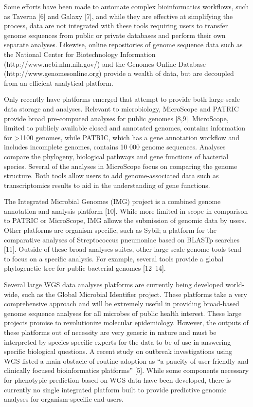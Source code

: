 \documentclass{bmcart}
\begin{document}
Some efforts have been made to automate complex bioinformatics workflows, such as Taverna [6] and Galaxy [7], and while they are effective at simplifying the process, data are not integrated with these tools requiring users to transfer genome sequences from public or private databases and perform their own separate analyses. Likewise, online repositories of genome sequence data such as the National Center for Biotechnology Information (http://www.ncbi.nlm.nih.gov/) and the Genomes Online Database (http://www.genomesonline.org) provide a wealth of data, but are decoupled from an efficient analytical platform.

Only recently have platforms emerged that attempt to provide both large-scale data storage and analyses. Relevant to microbiology, MicroScope and PATRIC provide broad pre-computed analyses for public genomes [8,9]. MicroScope, limited to publicly available closed and annotated genomes, contains information for >1100 genomes, while PATRIC, which has a gene annotation workflow and includes incomplete genomes, contains 10 000 genome sequences. Analyses compare the phylogeny, biological pathways and gene functions of bacterial species. Several of the analyses in MicroScope focus on comparing the genome structure. Both tools allow users to add genome-associated data such
as transcriptomics results to aid in the understanding of gene functions.

The Integrated Microbial Genomes (IMG) project is a combined genome annotation and analysis platform [10]. While more limited in scope in comparison to PATRIC or MicroScope, IMG allows the submission of genomic data by users. Other platforms are organism specific, such as Sybil; a platform for the comparative analyses of Streptococcus pneumoniae based on BLASTp searches [11]. Outside of these broad analyses suites, other large-scale genome tools tend to focus on a specific analysis. For example, several tools provide a global phylogenetic tree for public bacterial genomes [12–14]. 

Several large WGS data analyses platforms are currently being developed world-wide, such as the Global Microbial Identifier project. These platforms take a very comprehensive approach and will be extremely useful in providing broad-based genome sequence analyses for all microbes of public health interest. These large projects promise to revolutionize molecular epidemiology. However, the outputs of these platforms out of necessity are very generic in nature and must be interpreted by species-specific experts for the data to be of use in answering specific biological questions. A recent study on outbreak investigations using WGS listed a main obstacle of routine adoption as “a paucity of user-friendly and clinically focused bioinformatics platforms” [5]. While some components necessary for phenotypic prediction based on WGS data have been developed, there is currently no single integrated platform built to provide predictive genomic analyses for organism-specific end-users.
\end{document}
